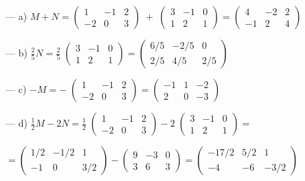 \begin{proofw}\renewcommand{\qedsymbol}{$\diamond$}

--- a) $M+N=\left( \begin{matrix} 1&-1&2\\-2&0&3  \end{matrix} \right)\; + \;\left( \begin{matrix} 3&-1&0\\1&2&1  \end{matrix} \right) = 
\left( \begin{matrix} 4&-2&2\\-1&2&4  \end{matrix} \right)$

\noindent --- b) $\frac 2 5 N = \frac 2 5 \; \left( \begin{matrix} 3&-1&0\\1&2&1  \end{matrix} \right) =\left( \begin{matrix} 6/5&-2/5&0\\2/5&4/5&2/5  \end{matrix} \right)$

\noindent --- c) $-M=-\; \left( \begin{matrix} 1&-1&2\\-2&0&3  \end{matrix} \right) =\left( \begin{matrix} -1&1&-2\\2&0&-3  \end{matrix} \right)$

\noindent --- d) $\frac 1 2 M -2N=\frac 1 2 \; \left( \begin{matrix} 1&-1&2\\-2&0&3  \end{matrix} \right) - 2 \; \left( \begin{matrix} 3&-1&0\\1&2&1  \end{matrix} \right)= $

\noindent $=\left( \begin{matrix} 1/2&-1/2&1\\-1&0&3/2  \end{matrix} \right)-
\left( \begin{matrix} 9&-3&0\\3&6&3  \end{matrix} \right)=
\left( \begin{matrix} -17/2&5/2&1\\-4&-6&-3/2  \end{matrix} \right) $


\end{proofw}
